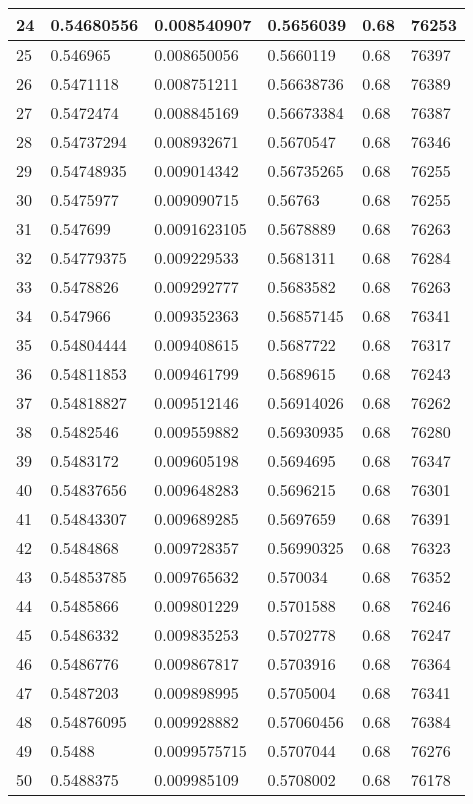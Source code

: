 \begin{longtable}{|l|l|l|l|l|l|}
24 & 0.54680556 & 0.008540907 & 0.5656039 & 0.68 & 76253 \\ \hline 
25 & 0.546965 & 0.008650056 & 0.5660119 & 0.68 & 76397 \\ \hline 
26 & 0.5471118 & 0.008751211 & 0.56638736 & 0.68 & 76389 \\ \hline 
27 & 0.5472474 & 0.008845169 & 0.56673384 & 0.68 & 76387 \\ \hline 
28 & 0.54737294 & 0.008932671 & 0.5670547 & 0.68 & 76346 \\ \hline 
29 & 0.54748935 & 0.009014342 & 0.56735265 & 0.68 & 76255 \\ \hline 
30 & 0.5475977 & 0.009090715 & 0.56763 & 0.68 & 76255 \\ \hline 
31 & 0.547699 & 0.0091623105 & 0.5678889 & 0.68 & 76263 \\ \hline 
32 & 0.54779375 & 0.009229533 & 0.5681311 & 0.68 & 76284 \\ \hline 
33 & 0.5478826 & 0.009292777 & 0.5683582 & 0.68 & 76263 \\ \hline 
34 & 0.547966 & 0.009352363 & 0.56857145 & 0.68 & 76341 \\ \hline 
35 & 0.54804444 & 0.009408615 & 0.5687722 & 0.68 & 76317 \\ \hline 
36 & 0.54811853 & 0.009461799 & 0.5689615 & 0.68 & 76243 \\ \hline 
37 & 0.54818827 & 0.009512146 & 0.56914026 & 0.68 & 76262 \\ \hline 
38 & 0.5482546 & 0.009559882 & 0.56930935 & 0.68 & 76280 \\ \hline 
39 & 0.5483172 & 0.009605198 & 0.5694695 & 0.68 & 76347 \\ \hline 
40 & 0.54837656 & 0.009648283 & 0.5696215 & 0.68 & 76301 \\ \hline 
41 & 0.54843307 & 0.009689285 & 0.5697659 & 0.68 & 76391 \\ \hline 
42 & 0.5484868 & 0.009728357 & 0.56990325 & 0.68 & 76323 \\ \hline 
43 & 0.54853785 & 0.009765632 & 0.570034 & 0.68 & 76352 \\ \hline 
44 & 0.5485866 & 0.009801229 & 0.5701588 & 0.68 & 76246 \\ \hline 
45 & 0.5486332 & 0.009835253 & 0.5702778 & 0.68 & 76247 \\ \hline 
46 & 0.5486776 & 0.009867817 & 0.5703916 & 0.68 & 76364 \\ \hline 
47 & 0.5487203 & 0.009898995 & 0.5705004 & 0.68 & 76341 \\ \hline 
48 & 0.54876095 & 0.009928882 & 0.57060456 & 0.68 & 76384 \\ \hline 
49 & 0.5488 & 0.0099575715 & 0.5707044 & 0.68 & 76276 \\ \hline 
50 & 0.5488375 & 0.009985109 & 0.5708002 & 0.68 & 76178 \\ \hline 
\end{longtable}